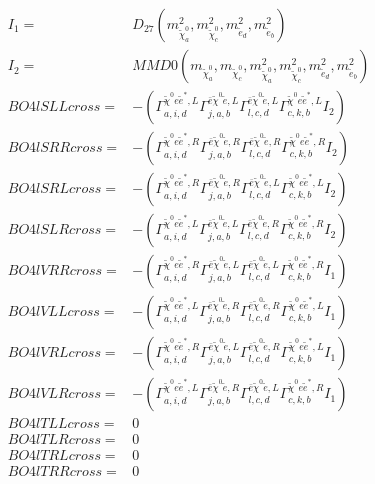 \documentclass[A4,landscape]{article}
\begin{document}
\begin{align} 
I_1 = & D_{27}(m^2_{\tilde{\chi}^0_{{a}}}, m^2_{\tilde{\chi}^0_{{c}}}, m^2_{\tilde{e}_{{d}}}, m^2_{\tilde{e}_{{b}}}) \\ 
I_2 = & MMD0(m_{\tilde{\chi}^0_{{a}}}, m_{\tilde{\chi}^0_{{c}}}, m^2_{\tilde{\chi}^0_{{a}}}, m^2_{\tilde{\chi}^0_{{c}}}, m^2_{\tilde{e}_{{d}}}, m^2_{\tilde{e}_{{b}}}) \\ 
  BO4lSLLcross= & -( \Gamma^{\tilde{\chi}^0 e \tilde{e}^*,L}_{a, i, d} \Gamma^{\bar{e}\tilde{\chi}^0 \tilde{e} ,L}_{j, a, b} \Gamma^{\bar{e}\tilde{\chi}^0 \tilde{e} ,L}_{l, c, d} \Gamma^{\tilde{\chi}^0 e \tilde{e}^*,L}_{c, k, b} I_2) \\ 
  BO4lSRRcross= & -( \Gamma^{\tilde{\chi}^0 e \tilde{e}^*,R}_{a, i, d} \Gamma^{\bar{e}\tilde{\chi}^0 \tilde{e} ,R}_{j, a, b} \Gamma^{\bar{e}\tilde{\chi}^0 \tilde{e} ,R}_{l, c, d} \Gamma^{\tilde{\chi}^0 e \tilde{e}^*,R}_{c, k, b} I_2) \\ 
  BO4lSRLcross= & -( \Gamma^{\tilde{\chi}^0 e \tilde{e}^*,R}_{a, i, d} \Gamma^{\bar{e}\tilde{\chi}^0 \tilde{e} ,R}_{j, a, b} \Gamma^{\bar{e}\tilde{\chi}^0 \tilde{e} ,L}_{l, c, d} \Gamma^{\tilde{\chi}^0 e \tilde{e}^*,L}_{c, k, b} I_2) \\ 
  BO4lSLRcross= & -( \Gamma^{\tilde{\chi}^0 e \tilde{e}^*,L}_{a, i, d} \Gamma^{\bar{e}\tilde{\chi}^0 \tilde{e} ,L}_{j, a, b} \Gamma^{\bar{e}\tilde{\chi}^0 \tilde{e} ,R}_{l, c, d} \Gamma^{\tilde{\chi}^0 e \tilde{e}^*,R}_{c, k, b} I_2) \\ 
  BO4lVRRcross= & -( \Gamma^{\tilde{\chi}^0 e \tilde{e}^*,R}_{a, i, d} \Gamma^{\bar{e}\tilde{\chi}^0 \tilde{e} ,L}_{j, a, b} \Gamma^{\bar{e}\tilde{\chi}^0 \tilde{e} ,L}_{l, c, d} \Gamma^{\tilde{\chi}^0 e \tilde{e}^*,R}_{c, k, b} I_1) \\ 
  BO4lVLLcross= & -( \Gamma^{\tilde{\chi}^0 e \tilde{e}^*,L}_{a, i, d} \Gamma^{\bar{e}\tilde{\chi}^0 \tilde{e} ,R}_{j, a, b} \Gamma^{\bar{e}\tilde{\chi}^0 \tilde{e} ,R}_{l, c, d} \Gamma^{\tilde{\chi}^0 e \tilde{e}^*,L}_{c, k, b} I_1) \\ 
  BO4lVRLcross= & -( \Gamma^{\tilde{\chi}^0 e \tilde{e}^*,R}_{a, i, d} \Gamma^{\bar{e}\tilde{\chi}^0 \tilde{e} ,L}_{j, a, b} \Gamma^{\bar{e}\tilde{\chi}^0 \tilde{e} ,R}_{l, c, d} \Gamma^{\tilde{\chi}^0 e \tilde{e}^*,L}_{c, k, b} I_1) \\ 
  BO4lVLRcross= & -( \Gamma^{\tilde{\chi}^0 e \tilde{e}^*,L}_{a, i, d} \Gamma^{\bar{e}\tilde{\chi}^0 \tilde{e} ,R}_{j, a, b} \Gamma^{\bar{e}\tilde{\chi}^0 \tilde{e} ,L}_{l, c, d} \Gamma^{\tilde{\chi}^0 e \tilde{e}^*,R}_{c, k, b} I_1) \\ 
  BO4lTLLcross= & 0 \\ 
  BO4lTLRcross= & 0 \\ 
  BO4lTRLcross= & 0 \\ 
  BO4lTRRcross= & 0 \\ 
\end{align} 
\end{document}
